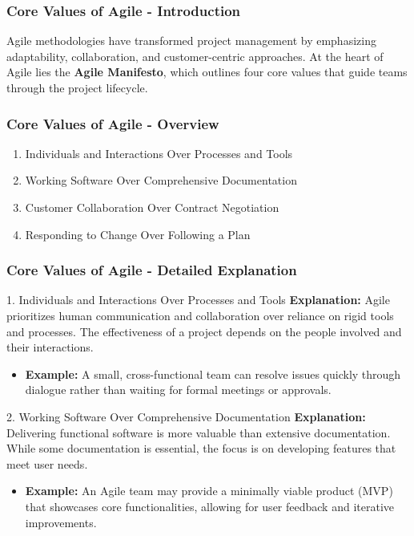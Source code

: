 \documentclass{beamer}
\begin{document}
\begin{frame}[fragile]
    \frametitle{Core Values of Agile - Introduction}
    Agile methodologies have transformed project management by emphasizing adaptability, collaboration, and customer-centric approaches. At the heart of Agile lies the \textbf{Agile Manifesto}, which outlines four core values that guide teams through the project lifecycle.
\end{frame}

\begin{frame}[fragile]
    \frametitle{Core Values of Agile - Overview}
    \begin{enumerate}
        \item Individuals and Interactions Over Processes and Tools
        \item Working Software Over Comprehensive Documentation
        \item Customer Collaboration Over Contract Negotiation
        \item Responding to Change Over Following a Plan
    \end{enumerate}
\end{frame}

\begin{frame}[fragile]
    \frametitle{Core Values of Agile - Detailed Explanation}
    \begin{block}{1. Individuals and Interactions Over Processes and Tools}
        \textbf{Explanation:} Agile prioritizes human communication and collaboration over reliance on rigid tools and processes. The effectiveness of a project depends on the people involved and their interactions.
        \begin{itemize}
            \item \textbf{Example:} A small, cross-functional team can resolve issues quickly through dialogue rather than waiting for formal meetings or approvals.
        \end{itemize}
    \end{block}

    \begin{block}{2. Working Software Over Comprehensive Documentation}
        \textbf{Explanation:} Delivering functional software is more valuable than extensive documentation. While some documentation is essential, the focus is on developing features that meet user needs.
        \begin{itemize}
            \item \textbf{Example:} An Agile team may provide a minimally viable product (MVP) that showcases core functionalities, allowing for user feedback and iterative improvements.
        \end{itemize}
    \end{block}
\end{frame}
\end{document}
